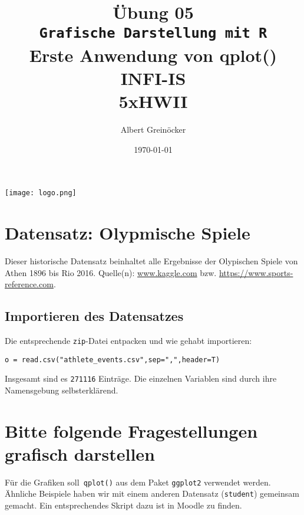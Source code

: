 \documentclass{article}
\title{Übung 05 \\ \texttt{Grafische Darstellung mit R} \\ Erste Anwendung von \textbf{qplot()} \\ INFI-IS \\ 5xHWII}
\date{\today} %
\author{Albert Greinöcker}
\begin{document}
\maketitle %

\begin{center}
\texttt{[image: logo.png]}
\end{center}
	\vspace{1cm}

\section{Datensatz: Olypmische Spiele}

Dieser historische Datensatz beinhaltet alle Ergebnisse der Olypischen Spiele von Athen 1896 bis Rio 2016. Quelle(n): \url{www.kaggle.com} bzw. \url{https://www.sports-reference.com}.


\subsection{Importieren des Datensatzes}

Die entsprechende \texttt{zip}-Datei entpacken und wie gehabt importieren:

 \begin{lstlisting} 
o = read.csv("athlete_events.csv",sep=",",header=T)
 \end{lstlisting}

Insgesamt sind es \texttt{271116} Einträge. Die einzelnen Variablen sind durch ihre Namensgebung selbsterklärend.


\section{Bitte folgende Fragestellungen grafisch darstellen}

Für die Grafiken soll\texttt{ qplot()} aus dem Paket \texttt{ggplot2} verwendet werden. Ähnliche Beispiele haben wir mit einem anderen Datensatz (\texttt{student}) gemeinsam gemacht. Ein entsprechendes Skript dazu ist in Moodle zu finden.
\end{document}
